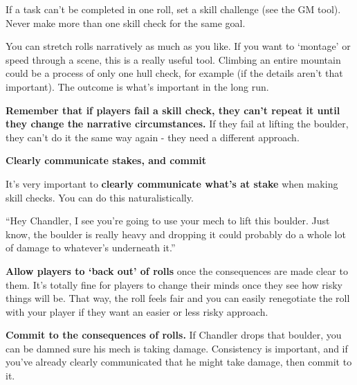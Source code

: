 If a task can’t be completed in one roll, set a skill challenge (see the GM tool). Never make more
than one skill check for the same goal.

You can stretch rolls narratively as much as you like. If you want to ‘montage’ or speed through a
scene, this is a really useful tool. Climbing an entire mountain could be a process of only one hull
check, for example (if the details aren’t that important). The outcome is what’s important in the
long run.

\textbf{Remember that if players fail a skill check, they can’t repeat it until they change the
narrative circumstances.} If they fail at lifting the boulder, they can’t do it the same way again -
they need a different approach.

\begin{center}
\textbf{Clearly communicate stakes, and commit}
\end{center}

It’s very important to \textbf{clearly communicate what’s at stake} when making skill checks. You can
do this naturalistically.

\quad“Hey Chandler, I see you’re going to use your mech to lift this boulder. Just know, the
boulder is really heavy and dropping it could probably do a whole lot of damage to whatever’s
underneath it.”

\textbf{Allow players to ‘back out’ of rolls} once the consequences are made clear to them. It’s totally
fine for players to change their minds once they see how risky things will be. That way, the roll
feels fair and you can easily renegotiate the roll with your player if they want an easier or less
risky approach.

\textbf{Commit to the consequences of rolls.} If Chandler drops that boulder, you can be damned sure
his mech is taking damage. Consistency is important, and if you’ve already clearly
communicated that he might take damage, then commit to it.

